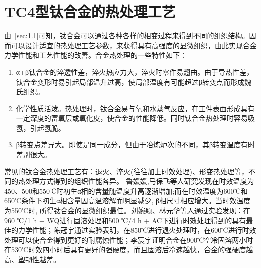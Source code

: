 \section{TC4型钛合金的热处理工艺}
由~\ref{sec:1.1}可知，钛合金可以通过各种各样的相变过程来得到不同的组织结构。因而可以设计适宜的热处理工艺参数，来获得具有高强度的显微组织，由此实现\ti 合金力学性能和工艺性能的改善。\ti 合金热处理的一些特性如下：
\begin{enumerate}
	\item α+β钛合金的淬透性差，淬火热应力大，淬火时零件易翘曲。由于导热性差，钛合金变形时易引起局部温升过高，使局部温度有可能超过β转变点而形成魏氏组织。
	\item 化学性质活泼。热处理时，钛合金易与氧和水蒸气反应，在工件表面形成具有一定深度的富氧层或氧化皮，使合金的性能降低。同时钛合金热处理时容易吸氢，引起氢脆。
	\item β转变点差异大。即使是同一成分，但由于冶炼炉次的不同，其β转变温度有时差别很大。
\end{enumerate}

常见的\ti 钛合金热处理工艺有：退火、淬火(往往加上时效处理)、形变热处理等，不同的热处理方式得到的组织性能各异。 鲁媛媛,马保飞等人研究发现在时效温度为450、500和550℃时初生α相的含量随温度升高逐渐增加;而在时效温度为600℃和650℃条件下初生α相含量因高温溶解而明显减少, β相尺寸相应增大。当时效温度为550℃时, 所得钛合金的显微组织最佳\cite{timing}。刘婉颖、林元华等人通过实验发现：在960 ℃/1 h + WQ进行固溶处理和500 ℃/4 h + AC下进行时效处理得到的\ti 具有最佳的力学性能\cite{960500}；陈冠宇通过实验表明，在850℃进行退火处理时，在600℃进行时效处理可以使合金得到更好的耐腐蚀性能\cite{1200}；李宸宇证明\ti 合金在900℃空冷固溶两小时在530℃时效四小时后具有更好的强硬度，而且固溶后冷速越快，合金的强硬度越高、塑韧性越差\cite{900}。%



